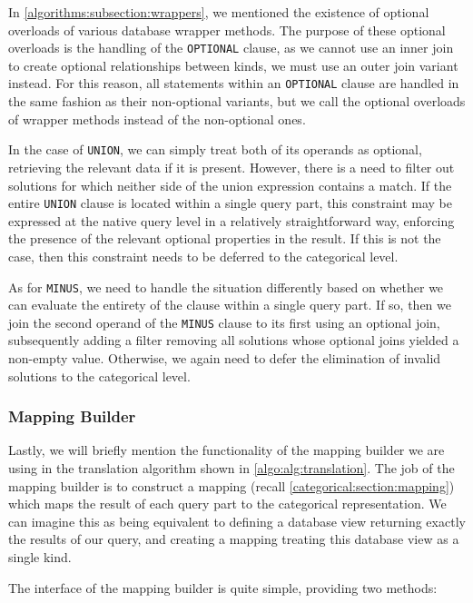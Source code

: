 In \cref{algorithms:subsection:wrappers}, we mentioned the existence of optional overloads of various database wrapper methods.
The purpose of these optional overloads is the handling of the \texttt{OPTIONAL} clause, as we cannot use an inner join to create optional relationships between kinds, we must use an outer join variant instead.
For this reason, all statements within an \texttt{OPTIONAL} clause are handled in the same fashion as their non-optional variants, but we call the optional overloads of wrapper methods instead of the non-optional ones.

In the case of \texttt{UNION}, we can simply treat both of its operands as optional, retrieving the relevant data if it is present.
However, there is a need to filter out solutions for which neither side of the union expression contains a match.
If the entire \texttt{UNION} clause is located within a single query part, this constraint may be expressed at the native query level in a relatively straightforward way, enforcing the presence of the relevant optional properties in the result.
If this is not the case, then this constraint needs to be deferred to the categorical level.

As for \texttt{MINUS}, we need to handle the situation differently based on whether we can evaluate the entirety of the clause within a single query part.
If so, then we join the second operand of the \texttt{MINUS} clause to its first using an optional join, subsequently adding a filter removing all solutions whose optional joins yielded a non-empty value.
Otherwise, we again need to defer the elimination of invalid solutions to the categorical level.

\subsubsection{Mapping Builder}

Lastly, we will briefly mention the functionality of the mapping builder we are using in the translation algorithm shown in \cref{algo:alg:translation}.
The job of the mapping builder is to construct a mapping (recall \cref{categorical:section:mapping}) which maps the result of each query part to the categorical representation.
We can imagine this as being equivalent to defining a database view returning exactly the results of our query, and creating a mapping treating this database view as a single kind.

The interface of the mapping builder is quite simple, providing two methods:

